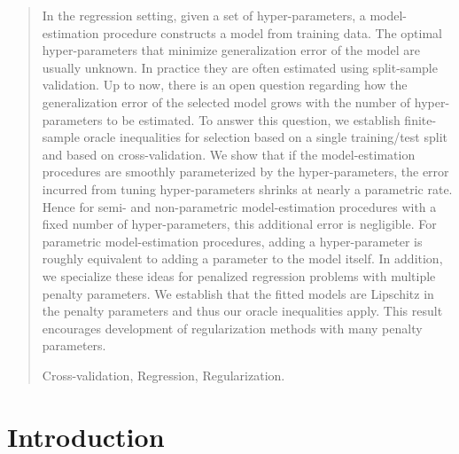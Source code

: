 \documentclass[12pt]{article} %
\renewcommand{\theequation}{\thesection\arabic{equation}}
\theoremstyle{definition}
\begin{document}
\begin{quotation}
In the regression setting, given a set of hyper-parameters, a model-estimation procedure constructs a model from training data. The optimal hyper-parameters that minimize generalization error of the model are usually unknown. In practice they are often estimated using split-sample validation. Up to now, there is an open question regarding how the generalization error of the selected model grows with the number of hyper-parameters to be estimated. To answer this question, we establish finite-sample oracle inequalities for selection based on a single training/test split and based on cross-validation. We show that if the model-estimation procedures are smoothly parameterized by the hyper-parameters, the error incurred from tuning hyper-parameters shrinks at nearly a parametric rate. Hence for semi- and non-parametric model-estimation procedures with a fixed number of hyper-parameters, this additional error is negligible. For parametric model-estimation procedures, adding a hyper-parameter is roughly equivalent to adding a parameter to the model itself. In addition, we specialize these ideas for penalized regression problems with multiple penalty parameters. We establish that the fitted models are Lipschitz in the penalty parameters and thus our oracle inequalities apply. This result encourages development of regularization methods with many penalty parameters.
\vspace{9pt}

Cross-validation, Regression, Regularization.
\par
\end{quotation}\par

\def\thefigure{\arabic{figure}}
\def\thetable{\arabic{table}}

\renewcommand{\theequation}{\thesection.\arabic{equation}}



\fontsize{12}{14pt plus.8pt minus .6pt}\selectfont

\setcounter{section}{1} %
\setcounter{equation}{0} %

\section{Introduction}

\end{document}
